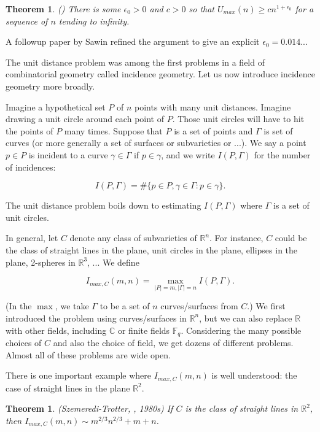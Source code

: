 \documentclass{amsart}
\newtheorem{theorem}[prop]{Theorem}
\newcommand{\FF}{\mathbb{F}}
\newcommand{\CC}{\mathbb{C}}
\newcommand{\RR}{\mathbb{R}}
\begin{document}
\begin{theorem} \label{counterunit} (\cite{OAI}) There is some $\epsilon_0 > 0$ and $c > 0$ so that $U_{max}(n) \ge c n^{1 + \epsilon_0}$ for a sequence of $n$ tending to infinity.  
\end{theorem}

\noindent A followup paper by Sawin \cite{Sa} refined the argument to give an explicit $\epsilon_0 = 0.014...$

 The unit distance problem was among the first problems in a field of combinatorial geometry called incidence geometry.  Let us now introduce incidence geometry more broadly.

Imagine a hypothetical set $P$ of $n$ points with many unit distances.   Imagine drawing a unit circle around each point of $P$.   Those unit circles will have to hit the points of $P$ many times.   Suppose that $P$ is a set of points and $\Gamma$ is set of curves (or more generally a set of surfaces or subvarieties or ...).   We say a point $p \in P$ is incident to a curve $\gamma \in \Gamma$ if $p \in \gamma$,  and we write $I(P,\Gamma)$ for the number of incidences:

$$ I(P, \Gamma) = \# \{ p \in P,  \gamma \in \Gamma: p \in \gamma \}. $$

\noindent The unit distance problem boils down to estimating $I(P, \Gamma)$ where $\Gamma$ is a set of unit circles.

In general,  let $C$ denote any class of subvarieties of $\RR^n$.  For instance,  $C$ could be the class of straight lines in the plane,  unit circles in the plane,  ellipses in the plane,  2-spheres in $\RR^3$,  ...   We define

$$ I_{max,  C}(m,n) = \max_{ |P| = m,  |\Gamma| = n }  I(P, \Gamma) . $$

\noindent (In the $\max$,  we take $\Gamma$ to be a set of $n$ curves/surfaces from $C$.)   We first introduced the problem using curves/surfaces in $\RR^n$,  but we can also replace $\RR$ with other fields,  including $\CC$ or finite fields $\FF_q$.   Considering the many possible choices of $C$ and also the choice of field,  we get dozens of different problems.   Almost all of these problems are wide open. 

There is one important example where $I_{max,C}(m,n)$ is well understood: the case of straight lines in the plane $\RR^2$.

\begin{theorem} \label{thmst} (Szemeredi-Trotter,  \cite{ST},  1980s) If $C$ is the class of straight lines in $\RR^2$,  then $I_{max,C}(m,n) \sim m^{2/3} n^{2/3} + m + n$.
\end{theorem}
\end{document}
